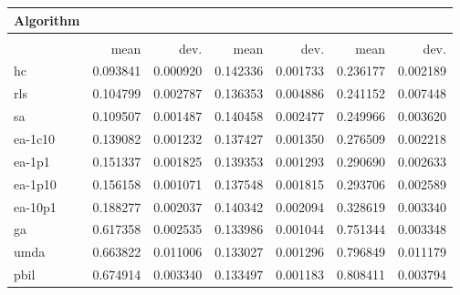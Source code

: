 \begin{tabular}{@{} l *{6}{>{{}}N{1}{2}} @{}}
\toprule
{Algorithm} &  \\
\midrule
&  &  &  \\
\midrule
& {mean} & {dev.} & {mean} & {dev.} & {mean} & {dev.} \\
\midrule
hc & 0.093841 & 0.000920 & 0.142336 & 0.001733 & 0.236177 & 0.002189 \\
rls & 0.104799 & 0.002787 & 0.136353 & 0.004886 & 0.241152 & 0.007448 \\
sa & 0.109507 & 0.001487 & 0.140458 & 0.002477 & 0.249966 & 0.003620 \\
ea-1c10 & 0.139082 & 0.001232 & 0.137427 & 0.001350 & 0.276509 & 0.002218 \\
ea-1p1 & 0.151337 & 0.001825 & 0.139353 & 0.001293 & 0.290690 & 0.002633 \\
ea-1p10 & 0.156158 & 0.001071 & 0.137548 & 0.001815 & 0.293706 & 0.002589 \\
ea-10p1 & 0.188277 & 0.002037 & 0.140342 & 0.002094 & 0.328619 & 0.003340 \\
ga & 0.617358 & 0.002535 & 0.133986 & 0.001044 & 0.751344 & 0.003348 \\
umda & 0.663822 & 0.011006 & 0.133027 & 0.001296 & 0.796849 & 0.011179 \\
pbil & 0.674914 & 0.003340 & 0.133497 & 0.001183 & 0.808411 & 0.003794 \\
\bottomrule
\end{tabular}
